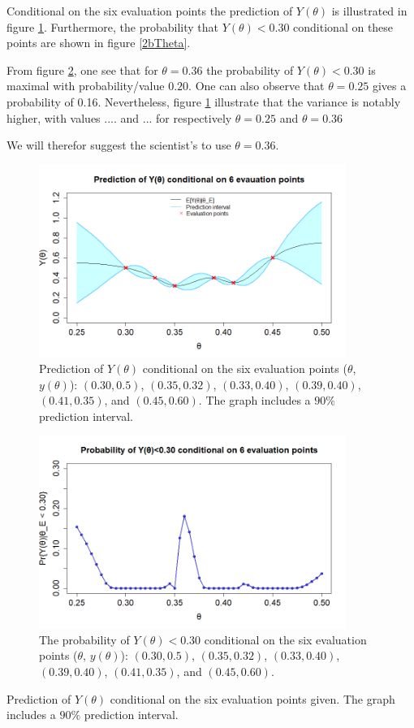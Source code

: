 Conditional on the six evaluation points the prediction of $Y(\theta)$ is illustrated in figure \ref{2cPred}. Furthermore, the probability that $Y(\theta)<0.30$ conditional on these points are shown in figure \ref{2bTheta}. 

From figure \ref{2cTheta}, one see that for $\theta = 0.36$ the probability of $Y(\theta)<0.30$ is maximal with probability/value $0.20$. One can also observe that $\theta = 0.25$ gives a probability of 0.16. Nevertheless, figure \ref{2cPred} illustrate that the variance is notably higher, with values .... and ... for respectively $\theta = 0.25$ and  $\theta = 0.36$

We will therefor suggest the scientist's to use $\theta = 0.36$. 

\begin{figure}
    \centering
    \includegraphics[width=100mm]{2cPred.png}
    \caption{Prediction of $Y(\theta)$ conditional on the six evaluation points  ($\theta$, $y(\theta)$): $(0.30,0.5)$, $(0.35,0.32)$, $(0.33, 0.40)$, $(0.39,0.40)$, $(0.41,0.35)$, and $(0.45,0.60)$. The graph includes a $90\%$ prediction interval. }
    \label{2cPred}
\end{figure}
\begin{figure}
    \centering
    \includegraphics[width=100mm]{2ctheta.png}
    \caption{The probability of $Y(\theta)<0.30$ conditional on the six evaluation points ($\theta$, $y(\theta)$): $(0.30,0.5)$, $(0.35,0.32)$, $(0.33, 0.40)$, $(0.39,0.40)$, $(0.41,0.35)$, and $(0.45,0.60)$.}
    \label{2cTheta}
\end{figure}

Prediction of $Y(\theta)$ conditional on the six evaluation points given. The graph includes a $90\%$ prediction interval. 